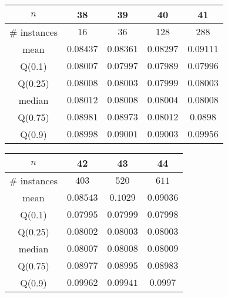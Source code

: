 \begin{tabular}{c|cccc} 
\hline 
$n$ & 38 & 39 & 40 & 41 \tabularnewline 
\hline 
\hline 
\# instances & $16$ & $36$ & $128$ & $288$ \tabularnewline 
mean & $0.08437$ & $0.08361$ & $0.08297$ & $0.09111$ \tabularnewline 
Q(0.1) & $0.08007$ & $0.07997$ & $0.07989$ & $0.07996$ \tabularnewline 
Q(0.25) & $0.08008$ & $0.08003$ & $0.07999$ & $0.08003$ \tabularnewline 
median & $0.08012$ & $0.08008$ & $0.08004$ & $0.08008$ \tabularnewline 
Q(0.75) & $0.08981$ & $0.08973$ & $0.08012$ & $0.0898$ \tabularnewline 
Q(0.9) & $0.08998$ & $0.09001$ & $0.09003$ & $0.09956$ \tabularnewline 
\hline 
\end{tabular} 
\medskip{} 

\begin{tabular}{c|ccc} 
\hline 
$n$ & 42 & 43 & 44 \tabularnewline 
\hline 
\hline 
\# instances & $403$ & $520$ & $611$ \tabularnewline 
mean & $0.08543$ & $0.1029$ & $0.09036$ \tabularnewline 
Q(0.1) & $0.07995$ & $0.07999$ & $0.07998$ \tabularnewline 
Q(0.25) & $0.08002$ & $0.08003$ & $0.08003$ \tabularnewline 
median & $0.08007$ & $0.08008$ & $0.08009$ \tabularnewline 
Q(0.75) & $0.08977$ & $0.08995$ & $0.08983$ \tabularnewline 
Q(0.9) & $0.09962$ & $0.09941$ & $0.0997$ \tabularnewline 
\hline 
\end{tabular} 
\medskip{} 

